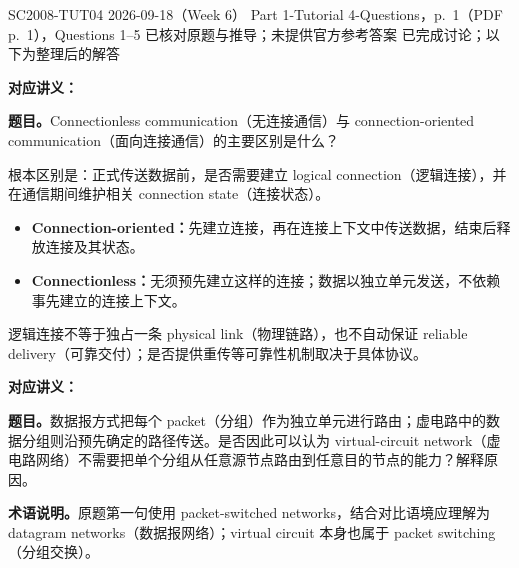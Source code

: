 
\label{tutorial:SC2008-TUT04}

\tutorialmeta
  {SC2008-TUT04}
  {2026-09-18（Week 6）}
  {Part 1-Tutorial 4-Questions，p.~1（PDF p.~1），Questions 1--5}
  {已核对原题与推导；未提供官方参考答案}
  {已完成讨论；以下为整理后的解答}



\textbf{对应讲义：}

\textbf{题目。}Connectionless communication（无连接通信）与 connection-oriented communication（面向连接通信）的主要区别是什么？

\begin{checkedsolution}
根本区别是：正式传送数据前，是否需要建立 logical connection（逻辑连接），并在通信期间维护相关 connection state（连接状态）。
\begin{itemize}
  \item \textbf{Connection-oriented：}先建立连接，再在连接上下文中传送数据，结束后释放连接及其状态。
  \item \textbf{Connectionless：}无须预先建立这样的连接；数据以独立单元发送，不依赖事先建立的连接上下文。
\end{itemize}
逻辑连接不等于独占一条 physical link（物理链路），也不自动保证 reliable delivery（可靠交付）；是否提供重传等可靠性机制取决于具体协议。
\end{checkedsolution}


\textbf{对应讲义：}

\textbf{题目。}数据报方式把每个 packet（分组）作为独立单元进行路由；虚电路中的数据分组则沿预先确定的路径传送。是否因此可以认为 virtual-circuit network（虚电路网络）不需要把单个分组从任意源节点路由到任意目的节点的能力？解释原因。

\textbf{术语说明。}原题第一句使用 packet-switched networks，结合对比语境应理解为 datagram networks（数据报网络）；virtual circuit 本身也属于 packet switching（分组交换）。

